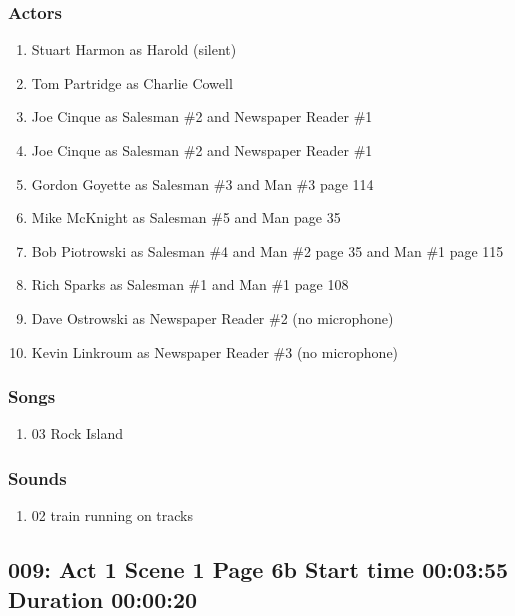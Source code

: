 \subsubsection{Actors}
\begin{enumerate}
\item Stuart Harmon as Harold (silent)
\item Tom Partridge as Charlie Cowell
\item Joe Cinque as Salesman \#2 and Newspaper Reader \#1
\item Joe Cinque as Salesman \#2 and Newspaper Reader \#1
\item Gordon Goyette as Salesman \#3 and Man \#3 page 114
\item Mike McKnight as Salesman \#5 and Man page 35
\item Bob Piotrowski as Salesman \#4 and Man \#2 page 35 and Man \#1 page 115
\item Rich Sparks as Salesman \#1 and Man \#1 page 108
\item Dave Ostrowski as Newspaper Reader \#2 (no microphone)
\item Kevin Linkroum as Newspaper Reader \#3 (no microphone)
\end{enumerate}

\subsubsection{Songs}
\begin{enumerate}
\item 03 Rock Island
\end{enumerate}\subsubsection{Sounds}
\begin{enumerate}
\item 02 train running on tracks
\end{enumerate}
\subsection{009: Act 1 Scene 1 Page 6b Start time 00:03:55 Duration 00:00:20}

